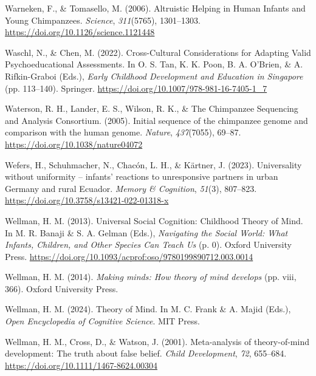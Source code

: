 \documentclass[
]{scrbook}
\newlength{\cslhangindent}
\newenvironment{CSLReferences}[2] %
 {\begin{list}{}{%
  \setlength{\itemindent}{0pt}
  \setlength{\leftmargin}{0pt}
  \setlength{\parsep}{0pt}
  \ifodd #1
   \setlength{\leftmargin}{\cslhangindent}
   \setlength{\itemindent}{-1\cslhangindent}
  \fi
  \setlength{\itemsep}{#2\baselineskip}}}
 {\end{list}}
\begin{document}
\begin{CSLReferences}{1}{0}
Warneken, F., \& Tomasello, M. (2006). Altruistic {Helping} in {Human Infants} and {Young Chimpanzees}. \emph{Science}, \emph{311}(5765), 1301--1303. \url{https://doi.org/10.1126/science.1121448}

Waschl, N., \& Chen, M. (2022). Cross-{Cultural Considerations} for {Adapting Valid Psychoeducational Assessments}. In O. S. Tan, K. K. Poon, B. A. O'Brien, \& A. Rifkin-Graboi (Eds.), \emph{Early {Childhood Development} and {Education} in {Singapore}} (pp. 113--140). Springer. \url{https://doi.org/10.1007/978-981-16-7405-1_7}

Waterson, R. H., Lander, E. S., Wilson, R. K., \& The Chimpanzee Sequencing and Analysis Consortium. (2005). Initial sequence of the chimpanzee genome and comparison with the human genome. \emph{Nature}, \emph{437}(7055), 69--87. \url{https://doi.org/10.1038/nature04072}

Wefers, H., Schuhmacher, N., Chacón, L. H., \& Kärtner, J. (2023). Universality without uniformity -- infants' reactions to unresponsive partners in urban {Germany} and rural {Ecuador}. \emph{Memory \& Cognition}, \emph{51}(3), 807--823. \url{https://doi.org/10.3758/s13421-022-01318-x}

Wellman, H. M. (2013). Universal {Social Cognition}: {Childhood Theory} of {Mind}. In M. R. Banaji \& S. A. Gelman (Eds.), \emph{Navigating the {Social World}: {What Infants}, {Children}, and {Other Species Can Teach Us}} (p. 0). Oxford University Press. \url{https://doi.org/10.1093/acprof:oso/9780199890712.003.0014}

Wellman, H. M. (2014). \emph{Making minds: {How} theory of mind develops} (pp. viii, 366). Oxford University Press.

Wellman, H. M. (2024). Theory of {Mind}. In M. C. Frank \& A. Majid (Eds.), \emph{Open {Encyclopedia} of {Cognitive Science}}. MIT Press.

Wellman, H. M., Cross, D., \& Watson, J. (2001). Meta-analysis of theory-of-mind development: {The} truth about false belief. \emph{Child Development}, \emph{72}, 655--684. \url{https://doi.org/10.1111/1467-8624.00304}


\end{CSLReferences}
\end{document}
